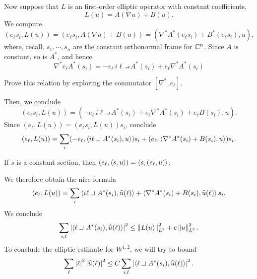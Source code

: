 \documentclass{amsart}
\begin{document}
  Now suppose that $L$ is an first-order elliptic operator with constant coefficients,
  \begin{equation*}
    L(u)=A(\nabla u)+B(u).
  \end{equation*}
  We compute
  \begin{equation*}
    (e_{\ell} s_{i},L(u))=(e_{\ell} s_{i},A(\nabla u)+B(u))=(\nabla^{*}A^{*}(e_{\ell} s_{i})+B^{*}(e_{\ell} s_{i}),u),
  \end{equation*}
  where, recall, $s_{1},\cdots,s_{n}$ are the constant orthonormal frame for $\mathbb{C}^{n}$. Since $A$ is constant, so is $A^{*}$, and hence
  \begin{equation*}
    \nabla^{*}e_{\ell} A^{*}(s_{i})=-e_{\ell}\,i\ell\intprod A^{*}(s_{i})+e_{\ell} \nabla^{*}A^{*}(s_{i})
  \end{equation*}
  \begin{xca}
    Prove this relation by exploring the commutator $[\nabla^{*},e_{\ell}]$.
  \end{xca}
  Then, we conclude
  \begin{equation*}
    (e_{\ell} s_{i},L(u))=(-e_{\ell}\,i\ell\intprod A^{*}(s_{i})+e_{\ell} \nabla^{*}A^{*}(s_{i})+e_{\ell}B(s_{i}),u).
  \end{equation*}
  Since $(e_{\ell},L(u))=(e_{\ell}s_{i},L(u))s_{i}$, conclude
  \begin{equation*}
    (e_{\ell},L(u))=\sum_{i}(-e_{\ell},\ip{i\ell\intprod A^{*}(s_{i}),u})s_{i}+(e_{\ell},\ip{\nabla^{*}A^{*}(s_{i})+B(s_{i}),u})s_{i}.
  \end{equation*}
  \begin{xca}
    If $s$ is a constant section, then $(e_{\ell},\left\langle s,u\right\rangle)=\left\langle s,(e_{\ell},u)\right\rangle$.
  \end{xca}
  We therefore obtain the nice formula
  \begin{equation*}
    (e_{\ell},L(u))=\sum_{i}\ip{i\ell\intprod A^{*}(s_{i}),\hat{u}(\ell)}+\ip{\nabla^{*}A^{*}(s_{i})+B(s_{i}),\hat{u}(\ell)}s_{i}.
  \end{equation*}
  We conclude
  \begin{equation*}
    \sum_{i,\ell}\abs{\ip{\ell\intprod A^{*}(s_{i}),\hat{u}(\ell)}}^{2}\le \norm{L(u)}_{L^{2}}^{2}+c\norm{u}_{L^{2}}^{2}.
  \end{equation*}
  To conclude the elliptic estimate for $W^{1,2}$, we will try to bound
  \begin{equation*}
    \sum_{\ell}\abs{\ell}^{2}\abs{\hat{u}(\ell)}^{2}\le C \sum_{i,\ell}\abs{\ip{\ell\intprod A^{*}(s_{i}),\hat{u}(\ell)}}^{2}.
  \end{equation*}
\end{document}
